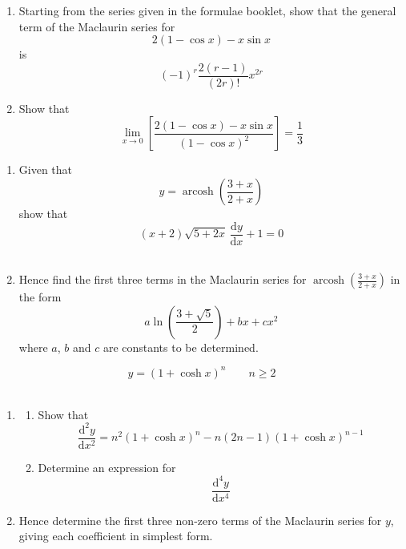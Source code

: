 \documentclass[leqno]{article}
\begin{document}
\begin{enumerate}[
  label=\textbf{\arabic*.},
  leftmargin=*,
  topsep=0pt,
  partopsep=0pt,
  parsep=0pt
]
\newpage

\questionitem

\begin{enumerate}[label=\textbf{(\alph*)}]
  \item Starting from the series given in the formulae booklet, show that the general term of the Maclaurin series for
  \[
  2(1-\cos x)-x\sin x
  \]
  is
  \[
  (-1)^r\frac{2(r-1)}{(2r)!}x^{2r}
  \]
  \item Show that
  \[
  \lim_{x\to 0}\left[\frac{2(1-\cos x)-x\sin x}{(1-\cos x)^2}\right]=\frac{1}{3}
  \]
\end{enumerate}
\newpage
\questionitem

\begin{enumerate}[label=\textbf{(\alph*)}]
  \item Given that \[y=\operatorname{arcosh}\left(\frac{3+x}{2+x}\right)\] show that \[(x+2)\sqrt{5+2x}\,\frac{\mathrm{d}y}{\mathrm{d}x}+1=0\]  \\
  \item Hence find the first three terms in the Maclaurin series for $\operatorname{arcosh}\left(\frac{3+x}{2+x}\right)$ in the form
  \[
  a\ln\left(\frac{3+\sqrt{5}}{2}\right)+bx+cx^2
  \]
  where $a$, $b$ and $c$ are constants to be determined.  \\
\end{enumerate}

\newpage
\questionitem

\[ y=(1+\cosh x)^n \qquad n\geq 2\] \\
\begin{enumerate}[label=\textbf{(\alph*)}]
  \item
  \begin{enumerate}[label=(\roman*)]
    \item Show that
    \[
    \frac{\mathrm{d}^2 y}{\mathrm{d}x^2}=n^2(1+\cosh x)^n-n(2n-1)(1+\cosh x)^{n-1}
    \]
    \item Determine an expression for
    \[
    \frac{\mathrm{d}^4 y}{\mathrm{d}x^4}
    \]
  \end{enumerate}
  \item Hence determine the first three non-zero terms of the Maclaurin series for $y$, giving each coefficient in simplest form.  \\
\end{enumerate}


\end{enumerate}
\end{document}
